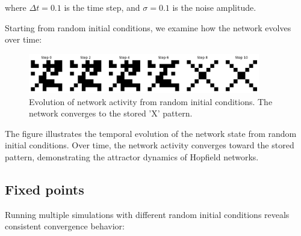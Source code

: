 \documentclass{article}
\begin{document}
where $\Delta t = 0.1$ is the time step, and $\sigma = 0.1$ is the noise amplitude.

Starting from random initial conditions, we examine how the network evolves over time:

\begin{figure}[H]
\centering
\includegraphics[width=0.9\textwidth]{Network Activity X.png}
\caption{Evolution of network activity from random initial conditions. The network converges to the stored 'X' pattern.}
\label{fig:network_dynamics}
\end{figure}

The figure illustrates the temporal evolution of the network state from random initial conditions. Over time, the network activity converges toward the stored pattern, demonstrating the attractor dynamics of Hopfield networks.




\subsection{Fixed points}


Running multiple simulations with different random initial conditions reveals consistent convergence behavior:
\end{document}
